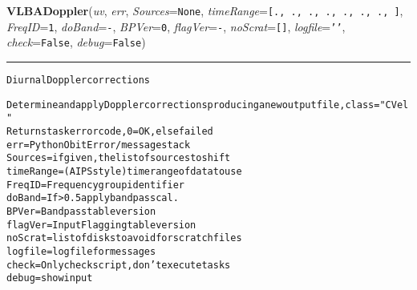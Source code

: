 \begin{boxedminipage}{\textwidth}
    \vspace{1ex}

    \end{boxedminipage}

    \label{VLBACal:VLBADoppler}
    \vspace{0.5ex}

    \begin{boxedminipage}{\textwidth}

    \raggedright \textbf{VLBADoppler}(\textit{uv}, \textit{err}, \textit{Sources}=\texttt{N\-o\-n\-e\-}, \textit{timeRange}=\texttt{[\-.\-,\-~\-.\-,\-~\-.\-,\-~\-.\-,\-~\-.\-,\-~\-.\-,\-~\-.\-,\-~\-]\-}, \textit{FreqID}=\texttt{1\-}, \textit{doBand}=\texttt{-\-}, \textit{BPVer}=\texttt{0\-}, \textit{flagVer}=\texttt{-\-}, \textit{noScrat}=\texttt{[\-]\-}, \textit{logfile}=\texttt{'\-'\-}, \textit{check}=\texttt{F\-a\-l\-s\-e\-}, \textit{debug}=\texttt{F\-a\-l\-s\-e\-})

    \vspace{-1.5ex}

    \rule{\textwidth}{0.5\fboxrule}
\begin{alltt}
Diurnal Doppler corrections

Determine and apply Doppler corrections producing a new output file, class = "CVel"
Returns task error code, 0=OK, else failed
err        = Python Obit Error/message stack
Sources    = if given, the list of sources to shift
timeRange  = (AIPS style) timerange of data to use
FreqID     = Frequency group identifier
doBand     = If {\textgreater}0.5 apply bandpass cal.
BPVer      = Bandpass table version
flagVer    = Input Flagging table version
noScrat    = list of disks to avoid for scratch files
logfile    = logfile for messages
check      = Only check script, don't execute tasks
debug      = show input\end{alltt}

    \vspace{1ex}

    \end{boxedminipage}

    \label{VLBACal:VLBAFreqInfo}
    \vspace{0.5ex}

